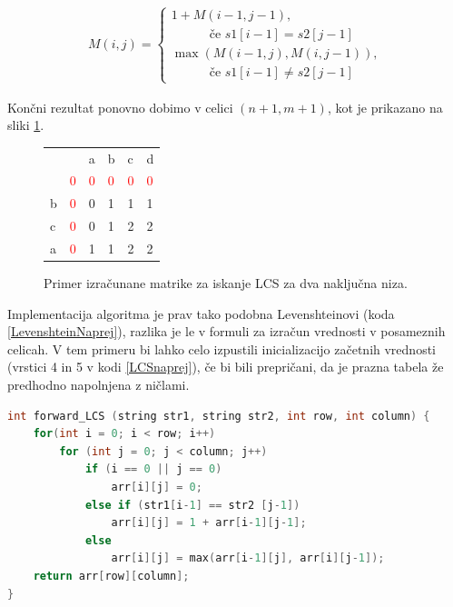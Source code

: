\documentclass[a4paper,12pt,openright]{book}
\begin{document}
\begin{equation}
\label{LCSequation}
\begin{aligned}
M(i, j) = 
\begin{cases}
     1 + M(i-1, j-1) ,      \\ \quad \quad \quad\text{če } s1[i-1]=s2[j-1]\\
     \max(M(i-1, j), M(i, j-1)) , \\ \quad \quad \quad \text{če } s1[i-1] \neq s2[j-1]
  \end{cases}
\end{aligned}
\end{equation}

\bigskip \bigskip

Končni rezultat ponovno dobimo v celici $(n+1, m+1)$, kot je prikazano na sliki \ref{LCSexample}. 

\begin{figure}[htb]
\centering
\begin{tabular}{|l|l|l|l|l|l|}
\cline{3-6}
  \multicolumn{2}{c|}{}  & a & b & c & d\\ \cline{2-6}
 \multicolumn{1}{c|}{} & \textcolor{red}{0} & \textcolor{red}{0} & \textcolor{red}{0} & \textcolor{red}{0} & \textcolor{red}{0}\\ \hline
b  & \textcolor{red}{0} & 0 & \cellcolor{blue!15}1 & 1 & 1\\ \hline
c  & \textcolor{red}{0} & 0 & 1 & \cellcolor{blue!15}2 & \cellcolor{blue!15}2\\ \hline
a  & \textcolor{red}{0} & 1 & 1 & 2 & \cellcolor{blue!25}2 \\ \hline
\end{tabular}
\caption{Primer izračunane matrike za iskanje LCS za dva naključna niza.}
\label{LCSexample}
\end{figure}

Implementacija algoritma je prav tako podobna Levenshteinovi (koda \ref{LevenshteinNaprej}), razlika je le v formuli za izračun vrednosti v posameznih celicah. V tem primeru bi lahko celo izpustili inicializacijo začetnih vrednosti (vrstici 4 in 5 v kodi \ref{LCSnaprej}), če bi bili prepričani, da je prazna tabela že predhodno napolnjena z ničlami. 

\bigskip \bigskip

\begin{lstlisting}[language=C++, caption={Algoritem za izračun razdalje LCS.}, captionpos=b, label=LCSnaprej]
int forward_LCS (string str1, string str2, int row, int column) {
    for(int i = 0; i < row; i++) 
        for (int j = 0; j < column; j++) 
            if (i == 0 || j == 0)
                arr[i][j] = 0;
            else if (str1[i-1] == str2 [j-1])
                arr[i][j] = 1 + arr[i-1][j-1];
            else
                arr[i][j] = max(arr[i-1][j], arr[i][j-1]);
    return arr[row][column];
}
\end{lstlisting}
\end{document}
